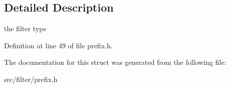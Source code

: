 \subsection{Detailed Description}
the filter type 

Definition at line 49 of file prefix.\-h.



The documentation for this struct was generated from the following file\-:\begin{DoxyCompactItemize}
\item 
src/filter/prefix.\-h\end{DoxyCompactItemize}
